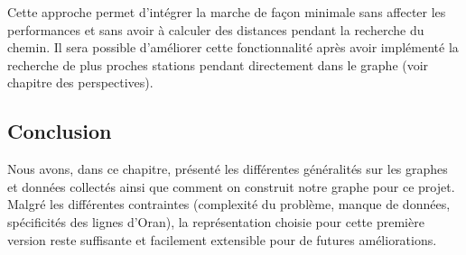 Cette approche permet d'intégrer la marche de façon minimale sans affecter les performances et sans avoir à calculer des distances pendant la recherche du chemin.
Il sera possible d'améliorer cette fonctionnalité après avoir implémenté la recherche de plus proches stations pendant directement dans le graphe (voir chapitre des perspectives).

\subsection{Conclusion}
Nous avons, dans ce chapitre, présenté les différentes généralités sur les graphes et données collectés ainsi que comment on construit notre graphe pour ce projet.
Malgré les différentes contraintes (complexité du problème, manque de données, spécificités des lignes d'Oran), la représentation choisie pour cette première version reste suffisante et facilement extensible pour de futures améliorations.
\newpage

